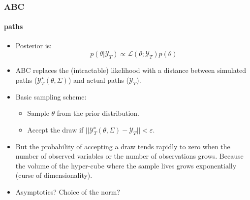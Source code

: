 \documentclass[10pt]{beamer}
\begin{document}
\begin{frame}
  \frametitle{ABC}
  \framesubtitle{paths}

  \begin{itemize}

  \item Posterior is:
    \[
      p(\theta|\mathcal Y_T) \propto \mathcal L (\theta; \mathcal Y_T) p(\theta) 
    \]

    \bigskip
    
  \item ABC replaces the (intractable) likelihood with a distance between simulated paths ($\mathcal Y_T^\star(\theta,\Sigma)$) and actual paths ($\mathcal Y_T$).\newline

    \bigskip
    
  \item Basic sampling scheme:
    \begin{itemize}
    \item Sample $\theta$ from the prior distribution.
    \item Accept the draw if $||\mathcal Y_T^\star(\theta,\Sigma)-\mathcal Y_T||<\varepsilon$.
    \end{itemize}

    \bigskip

  \item But the probability of accepting a draw tends rapidly to zero
    when the number of observed variables or the number of
    observations grows. Because the volume of the hyper-cube where the
    sample lives grows exponentially (curse of dimensionality).

    \bigskip
    
  \item Asymptotics? Choice of the norm?
    
  \end{itemize}
\end{frame}
\end{document}
